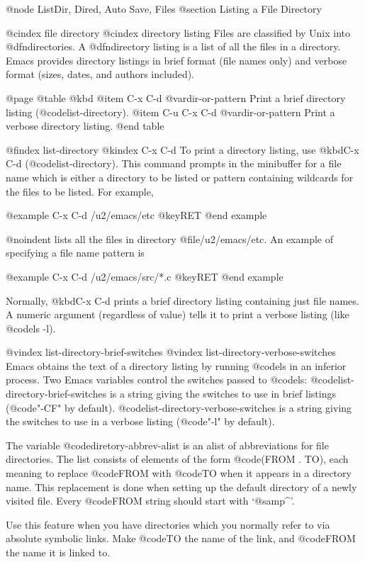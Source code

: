 {{{{{{{{{{{{{{{{{{{@node ListDir, Dired, Auto Save, Files
@section Listing a File Directory

@cindex file directory
@cindex directory listing
  Files are classified by Unix into @dfn{directories}.  A @dfn{directory
listing} is a list of all the files in a directory.  Emacs provides
directory listings in brief format (file names only) and verbose format
(sizes, dates, and authors included).

@page
@table @kbd
@item C-x C-d @var{dir-or-pattern}
Print a brief directory listing (@code{list-directory}).
@item C-u C-x C-d @var{dir-or-pattern}
Print a verbose directory listing.
@end table

@findex list-directory
@kindex C-x C-d
  To print a directory listing, use @kbd{C-x C-d}
(@code{list-directory}).  This command prompts in the minibuffer for a
file name which is either a  directory to be listed or pattern
containing wildcards for the files to be listed.  For example,

@example
C-x C-d /u2/emacs/etc @key{RET}
@end example

@noindent
lists all the files in directory @file{/u2/emacs/etc}.  An example of
specifying a file name pattern is

@example
C-x C-d /u2/emacs/src/*.c @key{RET}
@end example

  Normally, @kbd{C-x C-d} prints a brief directory listing containing just
file names.  A numeric argument (regardless of value) tells it to print a
verbose listing (like @code{ls -l}).

@vindex list-directory-brief-switches
@vindex list-directory-verbose-switches
  Emacs obtains the text of a directory listing by running @code{ls} in
an inferior process.  Two Emacs variables control the switches passed to
@code{ls}: @code{list-directory-brief-switches} is a string giving the
switches to use in brief listings (@code{"-CF"} by default).
@code{list-directory-verbose-switches} is a string giving the switches
to use in a verbose listing (@code{"-l"} by default).

The variable @code{diretory-abbrev-alist} is an alist of abbreviations
for file directories.  The list consists of elements of the form
@code{(FROM .  TO)}, each meaning to replace @code{FROM} with @code{TO}
when it appears in a directory name.  This replacement is done when
setting up the default directory of a newly visited file.  Every @code{FROM}
string should start with `@samp{^}'.

Use this feature when you have directories which you normally refer to
via absolute symbolic links.  Make @code{TO} the name of the link, and
@code{FROM} the name it is linked to.

}}}}}}}}}}}}}}}}}}}
